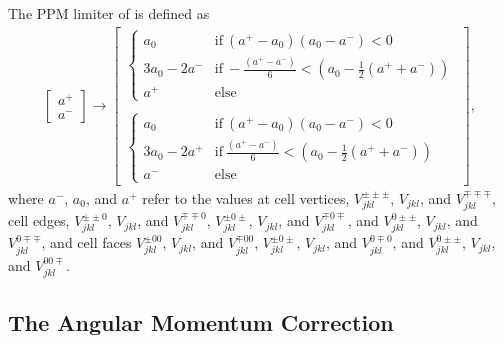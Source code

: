 \documentclass{aastex63}
\begin{document}
The PPM limiter of \cite{COLELLA1984} is defined as
\begin{align}
  \begin{bmatrix}
 	a^+ \\
        a^-
  \end{bmatrix} \rightarrow
  \begin{bmatrix}
 	\begin{cases}
             a_0 &  \mathrm{if} \ \left(a^+ - a_0\right)\left(a_0 - a^-\right) < 0 \\
             3 a_0 - 2 a^- & \mathrm{if}  \ -\frac{\left(a^+ - a^-\right)}{6} < \left(a_0 - \tfrac{1}{2}\left(a^+ + a^-\right)\right) \\
             a^+ &  \mathrm{else}
        \end{cases} \\
\\
         \begin{cases}
             a_0 &  \mathrm{if} \ \left(a^+ - a_0\right)\left(a_0 - a^-\right) < 0 \\
             3 a_0 - 2 a^+ & \mathrm{if} \ \frac{\left(a^+ - a^-\right)}{6} < \left(a_0 - \tfrac{1}{2}\left(a^+ + a^-\right)\right) \\
             a^- &  \mathrm{else}
        \end{cases}
  \end{bmatrix},
\end{align}
where $a^-$, $a_0$, and $a^+$ refer to the values at cell vertices, $V^{\pm\pm\pm}_{j k l}$, $V_{j k l}$, and $V^{\mp\mp\mp}_{j k l}$, cell edges,
$V^{\pm\pm 0}_{j k l}$, $V_{j k l}$, and $V^{\mp\mp 0}_{j k l}$,
$V^{\pm 0 \pm}_{j k l}$, $V_{j k l}$, and $V^{\mp 0 \mp}_{j k l}$,
and
$V^{0 \pm\pm}_{j k l}$, $V_{j k l}$, and $V^{0 \mp\mp}_{j k l}$, 
and cell faces
$V^{\pm 0 0}_{j k l}$, $V_{j k l}$, and $V^{\mp 0 0}_{j k l}$,
$V^{\pm 0 \pm}_{j k l}$, $V_{j k l}$, and $V^{0 \mp 0}_{j k l}$,
and
$V^{0 \pm \pm}_{j k l}$, $V_{j k l}$, and $V^{0 0 \mp}_{j k l}$.

\subsection{The Angular Momentum Correction}
\end{document}
